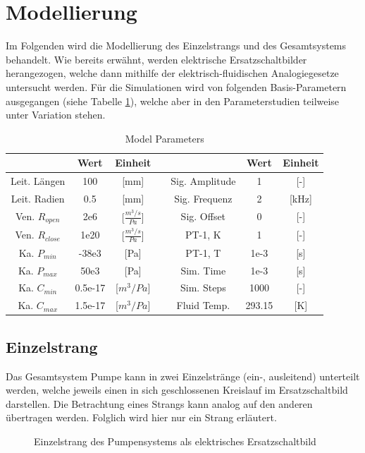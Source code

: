 \documentclass[fontsize=12pt, a4paper]{scrartcl}
\begin{document}
\section{Modellierung}

Im Folgenden wird die Modellierung des Einzelstrangs und des Gesamtsystems behandelt. Wie bereits erwähnt, werden elektrische Ersatzschaltbilder herangezogen, welche dann mithilfe der elektrisch-fluidischen Analogiegesetze untersucht werden. Für die Simulationen wird von folgenden Basis-Parametern ausgegangen (siehe Tabelle \ref{tab:modelparameters}), welche aber in den Parameterstudien teilweise unter Variation stehen.

\begin{table}[H]
\begin{tabular}[h]{c|c|c|c|c|c|c}
	  & Wert & Einheit & & & Wert & Einheit\\
	\hline
	Leit. Längen & 100 & [mm] & & Sig. Amplitude & 1 & [-] \\
	Leit. Radien & 0.5 & [mm] & & Sig. Frequenz & 2 & [kHz] \\
	Ven. $R_{open}$ & 2e6 & [$\frac{m^3/s}{Pa}$] & & Sig. Offset & 0 & [-] \\
	Ven. $R_{close}$ & 1e20 & [$\frac{m^3/s}{Pa}$] & & PT-1, K & 1 & [-] \\
	Ka. $P_{min}$ & -38e3 & [Pa] & & PT-1, T & 1e-3 & [s] \\
	Ka. $P_{max}$ & 50e3 & [Pa] & & Sim. Time & 1e-3 & [s] \\
	Ka. $C_{min}$ & 0.5e-17 & [$m^3/Pa$] & & Sim. Steps & 1000 & [-] \\
	Ka. $C_{max}$ & 1.5e-17 & [$m^3/Pa$] & & Fluid Temp. & 293.15 & [K]
\end{tabular}
\caption{\label{tab:modelparameters} Model Parameters}
\end{table}

\newpage

\subsection{Einzelstrang}

Das Gesamtsystem Pumpe kann in zwei Einzelstränge (ein-, ausleitend) unterteilt werden, welche jeweils einen in sich geschlossenen Kreislauf im Ersatzschaltbild darstellen.
Die Betrachtung eines Strangs kann analog auf den anderen übertragen werden. Folglich wird hier nur ein Strang erläutert.

\begin{figure}[H]
	
	\caption{Einzelstrang des Pumpensystems als elektrisches Ersatzschaltbild}
	\label{singlebranch}
\end{figure}
\end{document}
